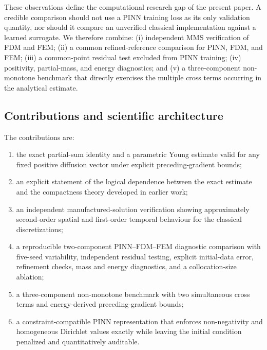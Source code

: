 These observations define the computational research gap of the present paper. A credible comparison should not use a PINN training loss as its only validation quantity, nor should it compare an unverified classical implementation against a learned surrogate. We therefore combine: (i) independent MMS verification of FDM and FEM; (ii) a common refined-reference comparison for PINN, FDM, and FEM; (iii) a common-point residual test excluded from PINN training; (iv) positivity, partial-mass, and energy diagnostics; and (v) a three-component non-monotone benchmark that directly exercises the multiple cross terms occurring in the analytical estimate.

\subsection{Contributions and scientific architecture}

The contributions are:
\begin{enumerate}
 \item the exact partial-sum identity and a parametric Young estimate valid for any fixed positive diffusion vector under explicit preceding-gradient bounds;
 \item an explicit statement of the logical dependence between the exact estimate and the compactness theory developed in earlier work;
 \item an independent manufactured-solution verification showing approximately second-order spatial and first-order temporal behaviour for the classical discretizations;
 \item a reproducible two-component PINN--FDM--FEM diagnostic comparison with five-seed variability, independent residual testing, explicit initial-data error, refinement checks, mass and energy diagnostics, and a collocation-size ablation;
 \item a three-component non-monotone benchmark with two simultaneous cross terms and energy-derived preceding-gradient bounds;
 \item a constraint-compatible PINN representation that enforces non-negativity and homogeneous Dirichlet values exactly while leaving the initial condition penalized and quantitatively auditable.
\end{enumerate}

